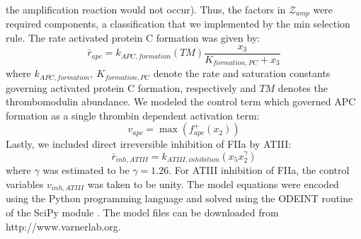 \documentclass[12pt]{article}
\begin{document}
the amplification reaction would not occur). Thus, the factors in $\mathcal{Z}_{amp}$ were required components, a classification
that we implemented by the min selection rule.
The rate activated protein C formation was given by:
\begin{equation}
	\bar{r}_{apc} = k_{APC,formation}\left(TM\right)\frac{x_{3}}{K_{formation,PC} + x_{3}}
\end{equation}where $k_{APC,formation},~K_{formation,PC}$ denote the rate and saturation constants governing activated protein C formation, respectively and $TM$ denotes
the thrombomodulin abundance. We modeled the control term which governed APC formation as a single thrombin dependent activation term:
\begin{equation}
	v_{apc} = \max\left(f_{apc}^{+}\left(x_{2}\right)\right)
\end{equation}
Lastly, we included direct irreversible inhibition of FIIa by ATIII:
\begin{equation}
	\bar{r}_{inh,ATIII} = k_{ATIII,inhibition}\left(x_{5}x_{2}^{\gamma}\right)
\end{equation}where $\gamma$ was estimated to be $\gamma = 1.26$. For ATIII inhibition of FIIa, the control variables $v_{inh,ATIII}$ was taken to be unity.
The model equations were encoded using the Python programming language and solved using the ODEINT routine of the SciPy module \citep{SCIPY}.
The model files can be downloaded from http://www.varnerlab.org.
\end{document}
